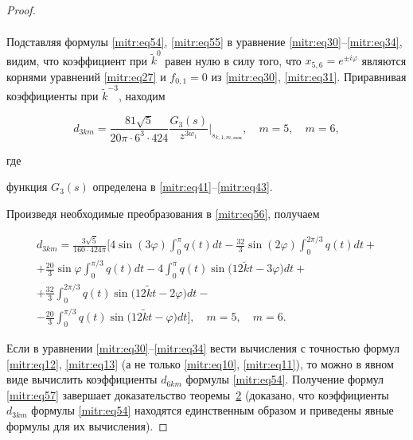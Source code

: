 \begin{proof}
\begin{multline}
\end{multline}



Подставляя формулы \eqref{mitr:eq54}, \eqref{mitr:eq55} в уравнение \eqref{mitr:eq30}--\eqref{mitr:eq34}, видим, что коэффициент при $\tilde k^0$ равен нулю в силу того, что $x_{5,6}=e^{\pm i\varphi}$ являются корнями уравнений \eqref{mitr:eq27} и $f_{0,1}=0$ из \eqref{mitr:eq30}, \eqref{mitr:eq31}. Приравнивая коэффициенты при $\tilde k^{-3}$, находим

\begin{equation}

\label{mitr:eq56}

d_{3km}=\frac{81\sqrt5}{20\pi \cdot 6^3\cdot 424}\frac{G_3(s)}{z^{3w_1}}\Big|_{s_{k,1,m,\text{осн}}}, \quad  m=5, \quad m=6,

\end{equation}

где

функция $G_3(s)$ определена в \eqref{mitr:eq41}--\eqref{mitr:eq43}. 

Произведя необходимые преобразования в \eqref{mitr:eq56}, получаем

\begin{multline}

\label{mitr:eq57}

d_{3km}=\frac{3\sqrt5}{160\cdot 424\pi}\biggl[

4\sin(3\varphi)\int ^\pi_0 q(t)dt-

\frac{32}3\sin (2\varphi)\int ^{2\pi/3}_0q(t)dt+\\+

\frac{20}3\sin \varphi\int ^{\pi/3}_0 q(t)dt-

4\int ^\pi_0 q(t)\sin\big(12\tilde kt-3\varphi\big)dt+\\+

\frac{32}3\int ^{2\pi/3}_0q(t)

\sin\big(12\tilde kt-2\varphi\big)dt-\\

-\frac{20}3\int ^{\pi/3}_0q(t)\sin\big(12\tilde kt-\varphi\big)dt\biggr], \quad m=5, \quad m=6.

\end{multline}



Если в уравнении \eqref{mitr:eq30}--\eqref{mitr:eq34} вести вычисления с точностью формул \eqref{mitr:eq12}, \eqref{mitr:eq13} (а не только \eqref{mitr:eq10}, \eqref{mitr:eq11}), то можно в явном виде вычислить коэффициенты $d_{6km}$ формулы \eqref{mitr:eq54}. Получение формул \eqref{mitr:eq57} завершает доказательство теоремы~\hyperlink{mitr:th2}{2} (доказано, что коэффициенты $d_{3km}$ формулы \eqref{mitr:eq54} находятся единственным образом и приведены явные формулы для их вычисления).

\end{proof}



